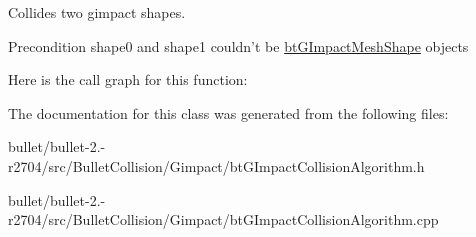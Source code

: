 Collides two gimpact shapes. 

\begin{DoxyPrecond}{Precondition}
shape0 and shape1 couldn't be \hyperlink{classbt_g_impact_mesh_shape}{bt\+G\+Impact\+Mesh\+Shape} objects 
\end{DoxyPrecond}


Here is the call graph for this function\+:




The documentation for this class was generated from the following files\+:\begin{DoxyCompactItemize}
\item 
bullet/bullet-\/2.-\/r2704/src/\+Bullet\+Collision/\+Gimpact/bt\+G\+Impact\+Collision\+Algorithm.\+h\item 
bullet/bullet-\/2.-\/r2704/src/\+Bullet\+Collision/\+Gimpact/bt\+G\+Impact\+Collision\+Algorithm.\+cpp\end{DoxyCompactItemize}
